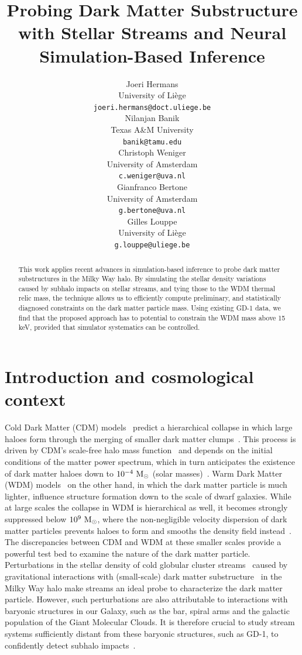 \documentclass{article}
\title{Probing Dark Matter Substructure with Stellar Streams and Neural Simulation-Based Inference}
\author{
  Joeri Hermans \\
  University of Li{\`e}ge \\
  \texttt{joeri.hermans@doct.uliege.be} \\
  \And
  Nilanjan Banik \\
  Texas A\&M University \\
  \texttt{banik@tamu.edu} \\
  \And
  Christoph Weniger \\
  University of Amsterdam \\
  \texttt{c.weniger@uva.nl} \\
  \And
  Gianfranco Bertone \\
  University of Amsterdam \\
  \texttt{g.bertone@uva.nl} \\
  \And
  Gilles Louppe \\
  University of Li{\`e}ge \\
  \texttt{g.louppe@uliege.be}
}
\begin{document}
\maketitle

\begin{abstract}
  This work applies recent advances in simulation-based inference to probe dark matter substructures in the Milky Way halo.
  By simulating the stellar density variations caused by subhalo impacts on stellar streams, and tying those to the WDM thermal relic mass,
  the technique allows us to efficiently compute preliminary, and statistically diagnosed constraints on the dark matter particle mass.  Using existing GD-1 data, we find that the proposed approach has to potential to constrain the WDM mass above 15 keV, provided that simulator systematics can be controlled.
\end{abstract}

\section{Introduction and cosmological context}
\label{sec:introduction}
Cold Dark Matter (CDM) models~\citep{1982ApJ...263L...1P,1984Natur.311..517B} predict
a hierarchical collapse in which large haloes form through the merging of smaller dark matter clumps~\cite{moore1999dark,avila1998formation,zhao2003growth}.
This process is driven by CDM's scale-free halo mass function~\cite{hofmann2001damping,schneider2013halo} and depends 
on the initial conditions of the matter power spectrum, which in turn 
anticipates the existence of 
dark matter haloes down to $10^{-4}~\textrm{M}_\odot$ (solar masses)~\cite{bertschinger2006effects}.
Warm Dark Matter (WDM) models~\cite{bond1983collisionless,dodelson1994sterile,2001ApJ...556...93B} on the other hand, in which the dark matter particle is much lighter, influence
structure formation down to the scale of dwarf galaxies. While at large scales the collapse in WDM is hierarchical as well, it becomes strongly suppressed
below $10^9~\textrm{M}_\odot$, where the non-negligible velocity dispersion of dark matter particles prevents haloes to form and smooths the density field instead~\cite{smith2011testing}.
The discrepancies between CDM and WDM at these smaller scales provide a powerful test bed to examine the nature of the dark matter particle.
Perturbations in the stellar density of cold globular cluster %
streams~\cite{banik2018probing,banik2019novel,Bonaca:2020psc,bonaca2019spur,bovy2016shape,Banik:2018pal} caused by gravitational interactions with (small-scale) dark matter substructure~\cite{ibata2002uncovering,johnston2002lumpy,yoon2011clumpy,carlberg2012dark}
in the Milky Way halo make
streams an ideal probe to characterize the dark matter particle. However, such perturbations are also attributable to
interactions with baryonic structures in our Galaxy, such as the bar, spiral arms and the galactic population of the Giant Molecular Clouds. It is therefore crucial to study stream systems sufficiently distant
from these baryonic structures, such as GD-1, to confidently detect subhalo impacts~\cite{banik2019effects}.
\end{document}
